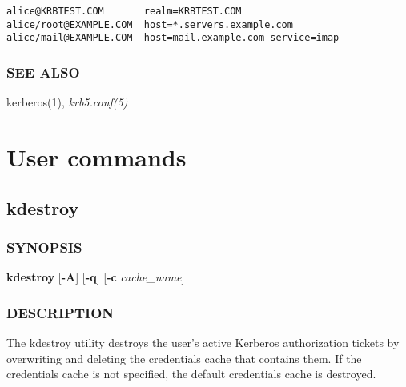 \documentclass[letterpaper,10pt,english]{sphinxmanual}
\begin{document}
\begin{Verbatim}[commandchars=\\\{\}]
alice@KRBTEST.COM       realm=KRBTEST.COM
alice/root@EXAMPLE.COM  host=*.servers.example.com
alice/mail@EXAMPLE.COM  host=mail.example.com service=imap
\end{Verbatim}


\subsection{SEE ALSO}
\label{user/user_config/k5identity:see-also}
kerberos(1), \emph{krb5.conf(5)}


\chapter{User commands}
\label{user/user_commands/index::doc}\label{user/user_commands/index:user-commands}\label{user/user_commands/index:id1}

\section{kdestroy}
\label{user/user_commands/kdestroy:kdestroy}\label{user/user_commands/kdestroy::doc}\label{user/user_commands/kdestroy:kdestroy-1}

\subsection{SYNOPSIS}
\label{user/user_commands/kdestroy:synopsis}
\textbf{kdestroy}
{[}\textbf{-A}{]}
{[}\textbf{-q}{]}
{[}\textbf{-c} \emph{cache\_name}{]}


\subsection{DESCRIPTION}
\label{user/user_commands/kdestroy:description}
The kdestroy utility destroys the user's active Kerberos authorization
tickets by overwriting and deleting the credentials cache that
contains them.  If the credentials cache is not specified, the default
credentials cache is destroyed.
\end{document}
